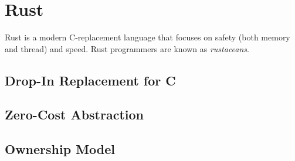 \section{Rust}

Rust is a modern C-replacement language that focuses on safety (both memory and thread) and speed. Rust programmers are known as \textsl{rustaceans}.

\subsection{Drop-In Replacement for C}
\subsection{Zero-Cost Abstraction}
\subsection{Ownership Model}

